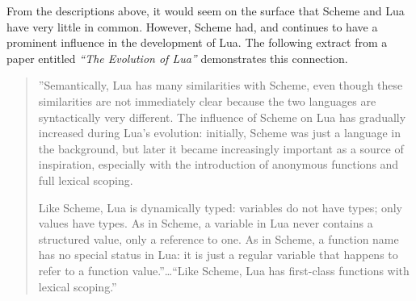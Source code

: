From the descriptions above, it would seem on the surface that Scheme and Lua
have very little in common. However, Scheme had, and continues to have a
prominent influence in the development of Lua. The following extract from a
paper entitled \emph{``The Evolution of Lua''} demonstrates this connection.

\begin{quotation}
''Semantically, Lua has many similarities with Scheme, even though these
similarities are not immediately clear because the two languages are
syntactically very different. The influence of Scheme on Lua has gradually
increased during Lua's evolution: initially, Scheme was just a language in the
background, but later it became increasingly important as a source of
inspiration, especially with the introduction of anonymous functions and full
lexical scoping.

Like Scheme, Lua is dynamically typed: variables do not have types; only values
have types. As in Scheme, a variable in Lua never contains a structured value,
only a reference to one. As in Scheme, a function name has no special status in
Lua: it is just a regular variable that happens to refer to a function
value.''\ldots ``Like Scheme, Lua has first-class functions with lexical
scoping.''~\cite[Sec~2]{evolua}
\end{quotation}
